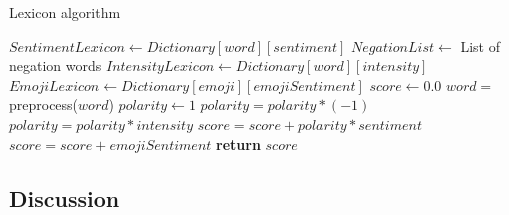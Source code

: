 \begin{algorithm}[]
  \caption{Lexicon algorithm}\label{lexiconAlg}
    \begin{algorithmic}[1]
            \State $SentimentLexicon \gets Dictionary[word][sentiment]$
            \State $NegationList \gets$ List of negation words
            \State $IntensityLexicon \gets Dictionary[word][intensity]$
            \State $EmojiLexicon \gets Dictionary[emoji][emojiSentiment]$ 
            \State $score \gets 0.0$
                \State $word =$ preprocess($word$)
                    \State $polarity \gets 1$
                            \State $polarity = polarity * (-1)$
                        \Else
                                \State $polarity = polarity * intensity$
                            \EndIf
                        \EndIf
                    \EndFor
                    \State $score = score + polarity * sentiment$
                \Else
                        \State $score = score + emojiSentiment$
                    \EndIf
                \EndIf 
            \EndFor
            \State \textbf{return} $score$
        \EndFunction
    \end{algorithmic}
\end{algorithm}

\subsection{Discussion}
